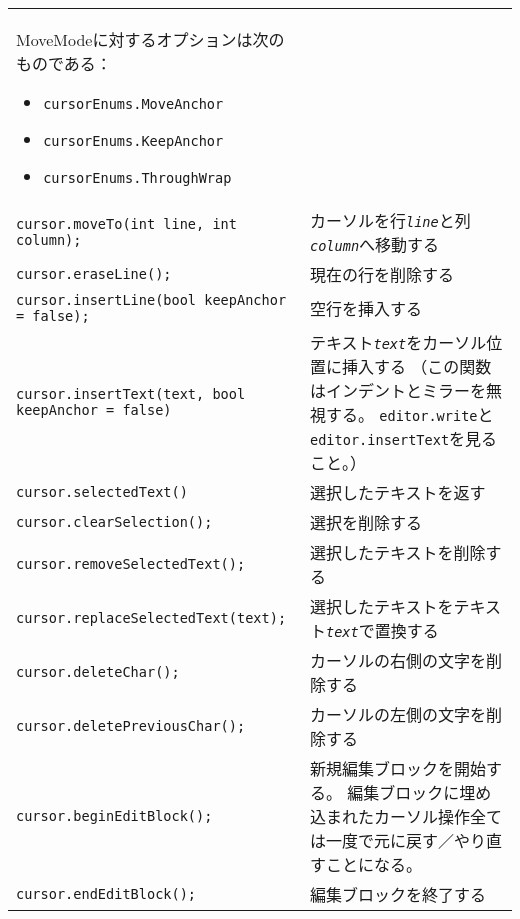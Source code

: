 \begin{longtable}{XX}
    MoveModeに対するオプションは次のものである：
    \begin{itemize}
    \item
      \texttt{cursorEnums.MoveAnchor}
    \item
      \texttt{cursorEnums.KeepAnchor}
    \item
      \texttt{cursorEnums.ThroughWrap}
    \end{itemize}\\
  \texttt{cursor.moveTo(int line, int column);}
    & カーソルを行\texttt{\emph{line}}と列\texttt{\emph{column}}へ移動する\\
  \texttt{cursor.eraseLine();} & 現在の行を削除する\\
  \texttt{cursor.insertLine(bool keepAnchor = false);} & 空行を挿入する\\
  \texttt{cursor.insertText(text, bool keepAnchor = false)}
    & テキスト\texttt{\emph{text}}をカーソル位置に挿入する
    （この関数はインデントとミラーを無視する。
    \texttt{editor.write}と\texttt{editor.insertText}を見ること。）\\
  \texttt{cursor.selectedText()} & 選択したテキストを返す\\
  \texttt{cursor.clearSelection();} & 選択を削除する\\
  \texttt{cursor.removeSelectedText();} & 選択したテキストを削除する\\
  \texttt{cursor.replaceSelectedText(text);}
    & 選択したテキストをテキスト\texttt{\emph{text}}で置換する\\
  \texttt{cursor.deleteChar();} & カーソルの右側の文字を削除する\\
  \texttt{cursor.deletePreviousChar();} & カーソルの左側の文字を削除する\\
  \texttt{cursor.beginEditBlock();}
    & 新規編集ブロックを開始する。
    編集ブロックに埋め込まれたカーソル操作全ては一度で元に戻す／やり直すことになる。\\
  \texttt{cursor.endEditBlock();} & 編集ブロックを終了する\\
  \hline
\end{longtable}
